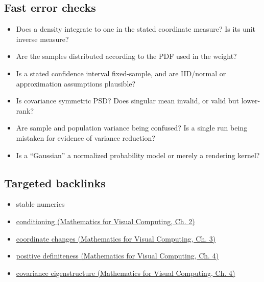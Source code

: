 \subsection{Fast error checks}\label{appendix-cb5af353ef77-fast-error-checks}

\begin{itemize}
\tightlist
\item
  Does a density integrate to one in the stated coordinate measure? Is its unit inverse measure?
\item
  Are the samples distributed according to the PDF used in the weight?
\item
  Is a stated confidence interval fixed-sample, and are IID/normal or approximation assumptions plausible?
\item
  Is covariance symmetric PSD? Does singular mean invalid, or valid but lower-rank?
\item
  Are sample and population variance being confused? Is a single run being mistaken for evidence of variance reduction?
\item
  Is a ``Gaussian'' a normalized probability model or merely a rendering kernel?
\end{itemize}

\subsection{Targeted backlinks}\label{appendix-cb5af353ef77-targeted-backlinks}

\begin{itemize}
\tightlist
\item
  {stable numerics}
\item
  \href{../02-Mathematics-for-Visual-Computing/main.pdf\#nameddest=01-foundations-i-ch018-an-inverse-can-exist-and-still-amplify-uncertainty}{conditioning (Mathematics for Visual Computing, Ch. 2)}
\item
  \href{../02-Mathematics-for-Visual-Computing/main.pdf\#nameddest=01-foundations-i-ch019-coordinates-can-change-while-the-geometric-object-stays-still}{coordinate changes (Mathematics for Visual Computing, Ch. 3)}
\item
  \href{../02-Mathematics-for-Visual-Computing/main.pdf\#nameddest=01-foundations-i-ch020-positive-definiteness-is-a-structural-promise}{positive definiteness (Mathematics for Visual Computing, Ch. 4)}
\item
  \href{../02-Mathematics-for-Visual-Computing/main.pdf\#nameddest=01-foundations-i-ch020-diagonalization-leads-to-the-stronger-symmetric-spectral-theorem}{covariance eigenstructure (Mathematics for Visual Computing, Ch. 4)}
\end{itemize}

